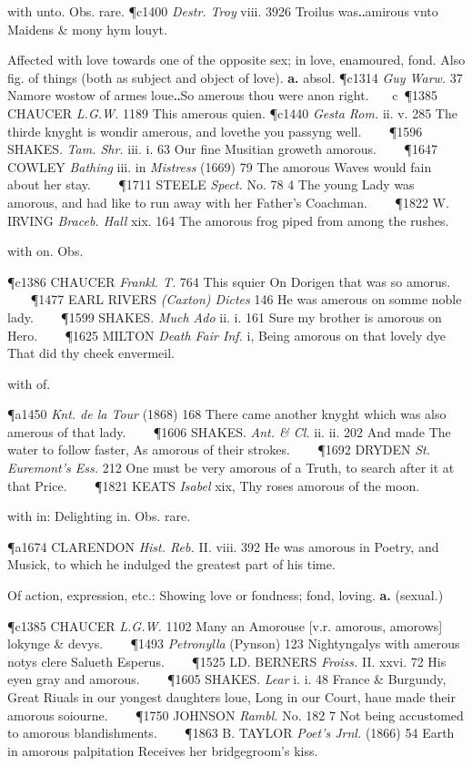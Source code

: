\begin{description}[wide, labelwidth=!, labelindent=0pt]
\begin{myenumerate}
 with unto. Obs. rare. 
\P c1400 \textit{Destr. Troy} viii. 3926 Troilus was‥amirous vnto Maidens \& mony hym louyt.

 Affected with love towards one of the opposite sex; in love, enamoured, fond. Also fig. of things (both as subject and object of love). \textbf{a.} absol. 
\P c1314 \textit{Guy Warw.} 37 Namore wostow of armes loue‥So amerous thou were anon right.    c 
\P 1385 CHAUCER \textit{L.G.W. } 1189 This amerous quien.
\P c1440 \textit{Gesta Rom.} ii. v. 285 The thirde knyght is wondir amerous, and lovethe you passyng well.    
\P 1596 SHAKES. \textit{Tam. Shr.} iii. i. 63 Our fine Musitian groweth amorous.    
\P 1647 COWLEY \textit{Bathing} iii. in \textit{Mistress} (1669) 79 The amorous Waves would fain about her stay.    
\P 1711 STEELE \textit{Spect.} No. 78 4 The young Lady was amorous, and had like to run away with her Father's Coachman.    
\P 1822 W. IRVING \textit{Braceb. Hall} xix. 164 The amorous frog piped from among the rushes.

 with on. Obs. 

\P c1386 CHAUCER \textit{Frankl. T.} 764 This squier On Dorigen that was so amorus.    
\P 1477 EARL RIVERS \textit{(Caxton) Dictes} 146 He was amerous on somme noble lady.    
\P 1599 SHAKES. \textit{Much Ado} ii. i. 161 Sure my brother is amorous on Hero.    
\P 1625 MILTON \textit{Death Fair Inf.} i, Being amorous on that lovely dye That did thy cheek envermeil.

 with of. 

\P a1450 \textit{Knt. de la Tour} (1868) 168 There came another knyght which was also amerous of that lady.    
\P 1606 SHAKES. \textit{Ant. \& Cl.} ii. ii. 202 And made The water to follow faster, As amorous of their strokes.    
\P 1692 DRYDEN \textit{St. Euremont's Ess.} 212 One must be very amorous of a Truth, to search after it at that Price.    
\P 1821 KEATS \textit{Isabel} xix, Thy roses amorous of the moon.

 with in: Delighting in. Obs. rare. 

\P a1674 CLARENDON \textit{Hist. Reb.} II. viii. 392 He was amorous in Poetry, and Musick, to which he indulged the greatest part of his time.

 Of action, expression, etc.: Showing love or fondness; fond, loving. \textbf{a.} (sexual.) 

\P c1385 CHAUCER \textit{L.G.W.} 1102 Many an Amorouse [v.r. amorous, amorows] lokynge \& devys.    
\P 1493 \textit{Petronylla} (Pynson) 123 Nightyngalys with amerous notys clere Salueth Esperus.    
\P 1525 LD. BERNERS \textit{Froiss.} II. xxvi. 72 His eyen gray and amorous.    
\P 1605 SHAKES. \textit{Lear} i. i. 48 France \& Burgundy, Great Riuals in our yongest daughters loue, Long in our Court, haue made their amorous soiourne.    
\P 1750 JOHNSON \textit{Rambl.} No. 182 7 Not being accustomed to amorous blandishments.    
\P 1863 B. TAYLOR \textit{Poet's Jrnl.} (1866) 54 Earth in amorous palpitation Receives her bridgegroom's kiss.


\end{myenumerate}
\end{description}
